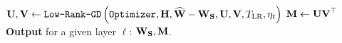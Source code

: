 \begin{algorithm}[h]
\begin{algorithmic}[]
            \Else
                \State $\mathbf{U}, \mathbf{V} \gets \texttt{Low-Rank-GD}\left({\texttt{Optimizer}, \mathbf{H}, \widehat{\mathbf{W}} - \mathbf{W_S}, \mathbf{U}, \mathbf{V}, T_{\text{LR}}, \eta_t}\right)$ 
            \EndIf
            \State {}
        \EndFor
        \State $\mathbf{M} \gets \mathbf{UV}^\top$
        \State \textbf{Output} for a given layer $\ell$: $\mathbf{W_S}, \mathbf{M}$.
    \end{algorithmic}
\end{algorithm}
